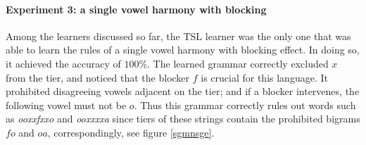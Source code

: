 \paragraph{Experiment 3: a single vowel harmony with blocking}

Among the learners discussed so far, the TSL learner was the only one that was able to learn the rules of a single vowel harmony with blocking effect.
In doing so, it achieved the accuracy of $100$\%.
The learned grammar correctly excluded $x$ from the tier, and noticed that the blocker $f$ is crucial for this language.
It prohibited disagreeing vowels adjacent on the tier; and if a blocker intervenes, the following vowel must not be $o$.
Thus this grammar correctly rules out words such as \emph{ooxxfxxo} and \emph{ooxxxxa} since tiers of these strings contain the prohibited bigrams $fo$ and $oa$, correspondingly, see figure \ref{sgmnsge}.

\begin{table}[h!]
\centering
{}
\caption{TSL learning of a single harmony with blockers; abstract representation.}
\end{table}


